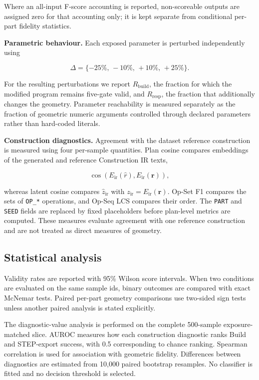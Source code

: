 \documentclass[preprint,12pt]{elsarticle}
\begin{document}
Where an all-input F-score accounting is reported, non-scoreable outputs are
assigned zero for that accounting only; it is kept separate from conditional
per-part fidelity statistics.

\textbf{Parametric behaviour.}
Each exposed parameter is perturbed independently using

\begin{equation}
  \Delta =
  \{-25\%,\,-10\%,\,+10\%,\,+25\%\}.
\end{equation}

For the resulting perturbations we report $R_{\mathrm{build}}$, the fraction
for which the modified program remains five-gate valid, and
$R_{\mathrm{resp}}$, the fraction that additionally changes the geometry.
Parameter reachability is measured separately as the fraction of geometric
numeric arguments controlled through declared parameters rather than
hard-coded literals.

\textbf{Construction diagnostics.}
Agreement with the dataset reference construction is measured using four
per-sample quantities. Plan cosine compares embeddings of the generated and
reference Construction IR texts,

\begin{equation}
  \cos
  \left(
  E_{\mathrm{ir}}(\hat{r}),
  E_{\mathrm{ir}}(\mathbf{r})
  \right),
\end{equation}

whereas latent cosine compares
$\hat{z}_{\mathrm{ir}}$ with
$z_{\mathrm{ir}}=E_{\mathrm{ir}}(\mathbf{r})$. Op-Set F1 compares the sets of
\texttt{OP\_*} operations, and Op-Seq LCS compares their order. The
\texttt{PART} and \texttt{SEED} fields are replaced by fixed placeholders
before plan-level metrics are computed. These measures evaluate agreement with
one reference construction and are not treated as direct measures of geometry.


\subsection{Statistical analysis}
\label{sec:intervals}

Validity rates are reported with 95\% Wilson score intervals. When two
conditions are evaluated on the same sample ids, binary outcomes are compared
with exact McNemar tests. Paired per-part geometry comparisons use two-sided
sign tests unless another paired analysis is stated explicitly.

The diagnostic-value analysis is performed on the complete 500-sample
exposure-matched slice. AUROC measures how each construction diagnostic ranks
Build and STEP-export success, with 0.5 corresponding to chance ranking.
Spearman correlation is used for association with geometric fidelity.
Differences between diagnostics are estimated from 10,000 paired bootstrap
resamples. No classifier is fitted and no decision threshold is selected.
\end{document}
